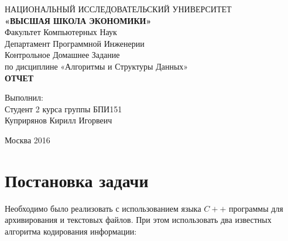 \documentclass[a4paper, 12pt]{article}
\begin{document}
\begingroup
    \fontsize{14pt}{14pt}\selectfont
\begin{center}
\hfill \break
\footnotesize{НАЦИОНАЛЬНЫЙ ИССЛЕДОВАТЕЛЬСКИЙ УНИВЕРСИТЕТ}\\
\small{\textbf{«ВЫСШАЯ ШКОЛА ЭКОНОМИКИ»}}\\
\hfill \break
\normalsize{Факультет Компьютерных Наук}\\
 \hfill \break
\normalsize{Департамент Программной Инженерии}\\
\hfill\break
\hfill \break
\hfill \break
\hfill \break
\hfill \break
\hfill \break
\hfill \break
\hfill \break
\normalsize{Контрольное Домашнее Задание\\
\hfill \break
по дисциплине «Алгоритмы и Структуры Данных»\\
\hfill \break
\textbf{ОТЧЕТ}}\\
\hfill \break
\hfill \break
\end{center}

\hfill \break
\hfill \break
\hfill \break
\hfill \break
\begin{flushright}
  \normalsize{Выполнил:}\\
  \normalsize{Студент 2 курса группы БПИ151}\\
  \normalsize{Куприрянов Кирилл Игорвеич}
\end{flushright}
\hfill \break
\hfill \break
\hfill \break
\hfill \break
\hfill \break
\hfill \break
\hfill \break
\begin{center} Москва 2016 \end{center}
\thispagestyle{empty} %

\endgroup

\newpage
    \tableofcontents %
\newpage

\newpage
\section{Постановка задачи}
Необходимо было реализовать с использованием языка $C++$ программы для
архивирования и текстовых файлов. При этом использовать два известных алгоритма
кодирования информации:
\end{document}
